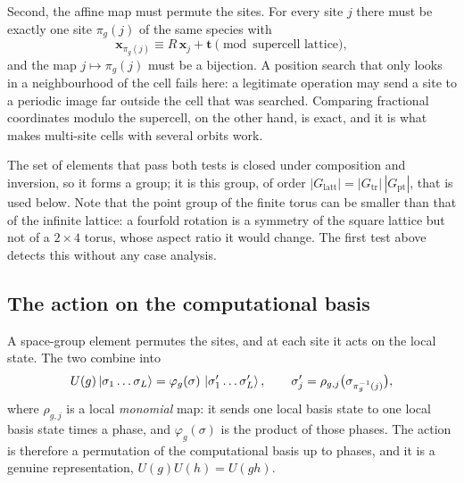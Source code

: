 \documentclass[12pt]{article}
\newcommand{\Glatt}{G_{\mathrm{latt}}}
\newcommand{\Gtr}{G_{\mathrm{tr}}}
\newcommand{\Gpt}{G_{\mathrm{pt}}}
\begin{document}
Second, the affine map must permute the sites. For every site $j$ there must be
exactly one site $\pi_g(j)$ of the same species with
\begin{equation}
  \mathbf{x}_{\pi_g(j)} \equiv R\,\mathbf{x}_j + \mathbf{t}
  \pmod{\text{supercell lattice}},
  \label{eq:sitemap}
\end{equation}
and the map $j \mapsto \pi_g(j)$ must be a bijection. A position search that only
looks in a neighbourhood of the cell fails here: a legitimate operation may send
a site to a periodic image far outside the cell that was searched. Comparing
fractional coordinates modulo the supercell, on the other hand, is exact, and it
is what makes multi-site cells with several orbits work.

The set of elements that pass both tests is closed under composition and
inversion, so it forms a group; it is this group, of order
$|\Glatt| = |\Gtr|\,|\Gpt|$, that is used below. Note that the point group of the
finite torus can be smaller than that of the infinite lattice: a fourfold rotation
is a symmetry of the square lattice but not of a $2\times4$ torus, whose aspect
ratio it would change. The first test above detects this without any case
analysis.

\subsection{The action on the computational basis}

A space-group element permutes the sites, and at each site it acts on the local
state. The two combine into
\begin{equation}
  U(g)\ket{\sigma_1\dots\sigma_L} = \varphi_g(\sigma)\,
  \ket{\sigma'_1\dots\sigma'_L},
  \qquad
  \sigma'_j = \rho_{g,j}\bigl(\sigma_{\pi_g^{-1}(j)}\bigr) ,
  \label{eq:action}
\end{equation}
where $\rho_{g,j}$ is a local \emph{monomial} map: it sends one local basis state
to one local basis state times a phase, and $\varphi_g(\sigma)$ is the product of
those phases. The action is therefore a permutation of the computational basis up
to phases, and it is a genuine representation, $U(g)U(h) = U(gh)$.
\end{document}
